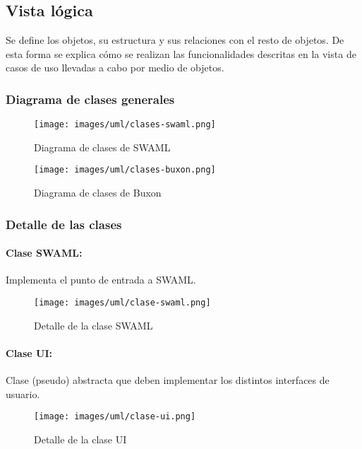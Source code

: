
\subsection{Vista lógica}

Se define los objetos, su estructura y sus relaciones con el resto de objetos.
De esta forma se explica cómo se realizan las funcionalidades descritas en la 
vista de casos de uso llevadas a cabo por medio de objetos. 

\subsubsection{Diagrama de clases generales}

\begin{figure}[H]
	\centering
 	\texttt{[image: images/uml/clases-swaml.png]}
	\caption{Diagrama de clases de SWAML}
	\label{fig:uml:swaml}
\end{figure}

\newpage

\begin{figure}[H]
	\centering
 	\texttt{[image: images/uml/clases-buxon.png]}
	\caption{Diagrama de clases de Buxon}
	\label{fig:uml:buxon}
\end{figure}

\newpage

\subsubsection{Detalle de las clases}

\paragraph{Clase SWAML:}

Implementa el punto de entrada a SWAML.

\begin{figure}[H]
	\centering
 	\texttt{[image: images/uml/clase-swaml.png]}
	\caption{Detalle de la clase SWAML}
	\label{fig:uml:swaml-class}
\end{figure}

\paragraph{Clase UI:}

Clase (pseudo) abstracta que deben implementar los distintos interfaces de
usuario.

\begin{figure}[H]
	\centering
 	\texttt{[image: images/uml/clase-ui.png]}
	\caption{Detalle de la clase UI}
	\label{fig:uml:ui-class}
\end{figure}

